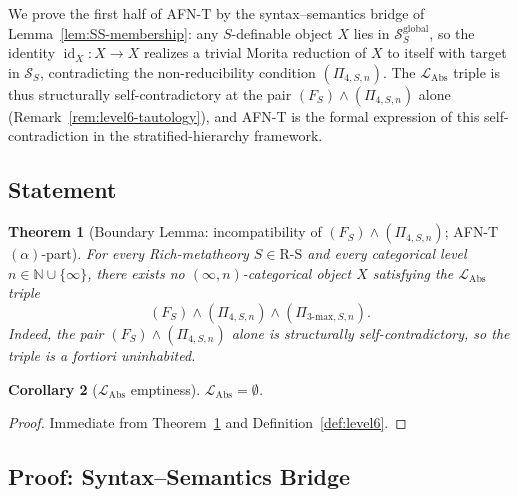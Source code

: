 \documentclass[11pt]{article}
\theoremstyle{plain}
\newtheorem{theorem}{Theorem}[section]
\newtheorem{corollary}[theorem]{Corollary}
\theoremstyle{definition}
\newcommand{\RS}{\mathrm{R\text{-}S}}
\newcommand{\cS}{\mathcal{S}}
\newcommand{\LAbs}{\mathcal{L}_{\mathrm{Abs}}}
\DeclareMathOperator{\id}{id}
\begin{document}
We prove the first half of AFN-T by the syntax--semantics bridge of Lemma~\ref{lem:SS-membership}: any $S$-definable object $X$ lies in $\cS_S^{\mathrm{global}}$, so the identity $\id_X : X \to X$ realizes a trivial Morita reduction of $X$ to itself with target in $\cS_S$, contradicting the non-reducibility condition $(\Pi_{4, S, n})$. The $\LAbs$ triple is thus structurally self-contradictory at the pair $(F_S) \wedge (\Pi_{4, S, n})$ alone (Remark~\ref{rem:level6-tautology}), and AFN-T is the formal expression of this self-contradiction in the stratified-hierarchy framework.

\subsection{Statement}

\begin{theorem}[Boundary Lemma: incompatibility of $(F_S) \wedge (\Pi_{4, S, n})$; AFN-T $(\alpha)$-part]\label{thm:afnt-alpha}
For every Rich-metatheory $S \in \RS$ and every categorical level $n \in \mathbb{N} \cup \{\infty\}$, there exists no $(\infty, n)$-categorical object $X$ satisfying the $\LAbs$ triple
\[
(F_S) \wedge (\Pi_{4, S, n}) \wedge (\Pi_{3\text{-max}, S, n}).
\]
Indeed, the pair $(F_S) \wedge (\Pi_{4, S, n})$ alone is structurally self-contradictory, so the triple is a fortiori uninhabited.
\end{theorem}

\begin{corollary}[$\LAbs$ emptiness]\label{cor:level6-empty-alpha}
$\LAbs = \emptyset$.
\end{corollary}

\begin{proof}
Immediate from Theorem~\ref{thm:afnt-alpha} and Definition~\ref{def:level6}.
\end{proof}

\subsection{Proof: Syntax--Semantics Bridge}\label{subsec:ss-bridge-proof}
\end{document}
